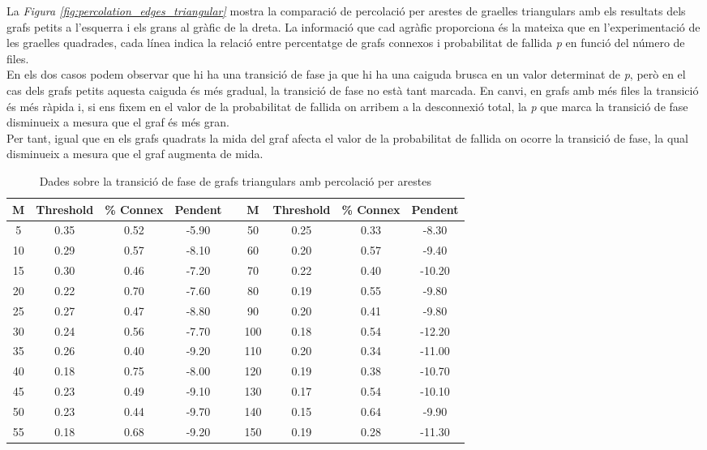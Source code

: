\documentclass[a4paper]{article}
\begin{document}
	La \textit{Figura \ref{fig:percolation_edges_triangular}} mostra la comparació de percolació per arestes de graelles triangulars amb els resultats dels grafs petits a l'esquerra i els grans al gràfic de la dreta. La informació que cad agràfic proporciona és la mateixa que en l'experimentació de les graelles quadrades, cada línea indica la relació entre percentatge de grafs connexos i probabilitat de fallida \textit{p} en funció del número de files. \\
	
	En els dos casos podem observar que hi ha una transició de fase ja que hi ha una caiguda brusca en un valor determinat de \textit{p}, però en el cas dels grafs petits aquesta caiguda és més gradual, la transició de fase no està tant marcada. En canvi, en grafs amb més files la transició és més ràpida i, si ens fixem en el valor de la probabilitat de fallida on arribem a la desconnexió total, la \textit{p} que marca la transició de fase disminueix a mesura que el graf és més gran. \\
	
	Per tant, igual que en els grafs quadrats la mida del graf afecta el valor de la probabilitat de fallida on ocorre la transició de fase, la qual disminueix a mesura que el graf augmenta de mida. 
	
	\begin{table}[H]
		\centering
		\begin{tabular}{|c|c|c|c|c|c|c|c|c|}
			\hline
			\rowcolor{gray!30}
			M & Threshold & \% Connex & Pendent &   & M & Threshold & \% Connex & Pendent \\ \hline
			5 & 0.35 & 0.52 & -5.90  &   & 50 & 0.25 & 0.33 & -8.30 \\ \hline
			10 & 0.29 & 0.57 & -8.10 &   & 60 & 0.20 & 0.57 & -9.40 \\ \hline
			15 & 0.30 & 0.46 & -7.20 &   & 70 & 0.22 & 0.40 & -10.20 \\ \hline
			20 & 0.22 & 0.70 & -7.60 &   & 80 & 0.19 & 0.55 & -9.80 \\ \hline
			25 & 0.27 & 0.47 & -8.80 &   & 90 & 0.20 & 0.41 & -9.80 \\ \hline
			30 & 0.24 & 0.56 & -7.70 &   & 100 & 0.18 & 0.54 & -12.20 \\ \hline
			35 & 0.26 & 0.40 & -9.20 &   & 110 & 0.20 & 0.34 & -11.00 \\ \hline
			40 & 0.18 & 0.75 & -8.00 &   & 120 & 0.19 & 0.38 & -10.70 \\ \hline
			45 & 0.23 & 0.49 & -9.10 &   & 130 & 0.17 & 0.54 & -10.10 \\ \hline
			50 & 0.23 & 0.44 & -9.70 &   & 140 & 0.15 & 0.64 & -9.90 \\ \hline
			55 & 0.18 & 0.68 & -9.20 &   & 150 & 0.19 & 0.28 & -11.30 \\ \hline
			
		\end{tabular}
		\caption{Dades sobre la transició de fase de grafs triangulars amb percolació per arestes}
		\label{tab:data_edges_triangulars}
	\end{table}
	
\end{document}
